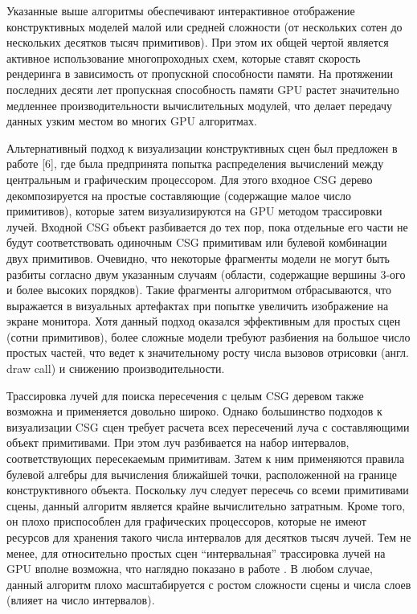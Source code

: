 {{{{{Указанные выше алгоритмы обеспечивают интерактивное отображение конструктивных моделей малой или средней  сложности (от нескольких сотен до нескольких десятков тысяч примитивов). При этом их общей чертой является активное использование многопроходных схем, которые ставят скорость рендеринга в зависимость от пропускной способности памяти. На протяжении последних десяти лет пропускная способность памяти GPU растет значительно медленнее производительности вычислительных модулей,  что делает передачу данных узким местом во многих GPU алгоритмах.

Альтернативный подход к визуализации конструктивных сцен был предложен в работе [6], где была предпринята попытка распределения вычислений между центральным и графическим процессором. Для этого входное CSG дерево декомпозируется на простые составляющие (содержащие малое число примитивов), которые затем визуализируются на GPU методом трассировки лучей. Входной CSG объект разбивается до тех пор, пока отдельные его части не будут соответствовать одиночным CSG примитивам или булевой  комбинации двух примитивов. Очевидно, что некоторые фрагменты модели не могут быть разбиты согласно двум указанным случаям (области, содержащие вершины 3-ого и более высоких порядков). Такие фрагменты алгоритмом отбрасываются, что выражается в визуальных артефактах при попытке увеличить изображение на экране монитора. Хотя данный подход оказался эффективным для простых сцен (сотни примитивов), более сложные модели требуют разбиения на большое число простых частей, что ведет к значительному росту числа вызовов отрисовки (англ. draw call) и снижению производительности.

Трассировка лучей для поиска пересечения с целым CSG деревом также возможна и применяется довольно широко. Однако большинство подходов к визуализации CSG сцен требует расчета всех пересечений луча с составляющими объект примитивами. При этом луч разбивается на набор интервалов, соответствующих пересекаемым примитивам. Затем к ним применяются правила булевой алгебры для вычисления ближайшей точки, расположенной на границе конструктивного объекта. Поскольку луч следует пересечь со всеми примитивами сцены, данный алгоритм является крайне вычислительно затратным. Кроме того, он плохо приспособлен для графических процессоров, которые не имеют ресурсов для хранения такого числа интервалов для десятков тысяч лучей. Тем не менее, для относительно простых сцен “интервальная” трассировка лучей на GPU вполне возможна, что наглядно показано в работе \todo{[7]}. В любом случае, данный алгоритм плохо масштабируется с ростом сложности сцены и числа слоев (влияет на число интервалов).

}}}}}
